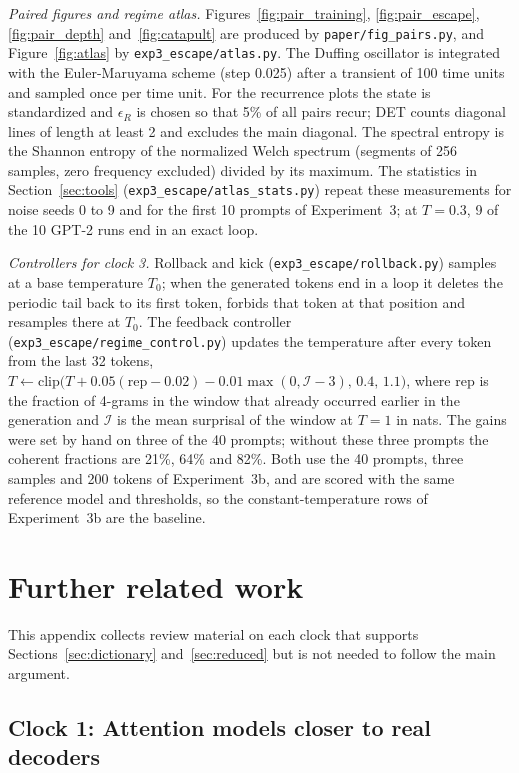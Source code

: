 \emph{Paired figures and regime atlas.} Figures~\ref{fig:pair_training}, \ref{fig:pair_escape}, \ref{fig:pair_depth} and~\ref{fig:catapult} are produced by \texttt{paper/fig\_pairs.py}, and Figure~\ref{fig:atlas} by \texttt{exp3\_escape/atlas.py}. The Duffing oscillator is integrated with the Euler-Maruyama scheme (step 0.025) after a transient of 100 time units and sampled once per time unit. For the recurrence plots the state is standardized and $\epsilon_R$ is chosen so that 5\% of all pairs recur; DET counts diagonal lines of length at least 2 and excludes the main diagonal. The spectral entropy is the Shannon entropy of the normalized Welch spectrum (segments of 256 samples, zero frequency excluded) divided by its maximum. The statistics in Section~\ref{sec:tools} (\texttt{exp3\_escape/atlas\_stats.py}) repeat these measurements for noise seeds 0 to 9 and for the first 10 prompts of Experiment~3; at $T=0.3$, 9 of the 10 GPT-2 runs end in an exact loop.

\emph{Controllers for clock 3.} Rollback and kick (\texttt{exp3\_escape/rollback.py}) samples at a base temperature $T_0$; when the generated tokens end in a loop it deletes the periodic tail back to its first token, forbids that token at that position and resamples there at $T_0$. The feedback controller (\texttt{exp3\_escape/regime\_control.py}) updates the temperature after every token from the last 32 tokens, $T\leftarrow\mathrm{clip}\big(T+0.05(\mathrm{rep}-0.02)-0.01\max(0,\mathcal{I}-3),\,0.4,\,1.1\big)$, where $\mathrm{rep}$ is the fraction of 4-grams in the window that already occurred earlier in the generation and $\mathcal{I}$ is the mean surprisal of the window at $T=1$ in nats. The gains were set by hand on three of the 40 prompts; without these three prompts the coherent fractions are 21\%, 64\% and 82\%. Both use the 40 prompts, three samples and 200 tokens of Experiment~3b, and are scored with the same reference model and thresholds, so the constant-temperature rows of Experiment~3b are the baseline.

\section{Further related work}
\label{app:related}

This appendix collects review material on each clock that supports Sections~\ref{sec:dictionary} and~\ref{sec:reduced} but is not needed to follow the main argument.

\subsection{Clock 1: Attention models closer to real decoders}

